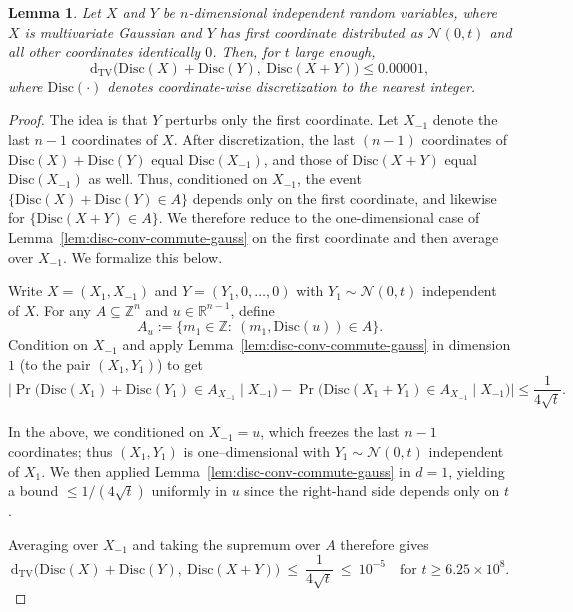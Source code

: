\documentclass[10pt]{article} %
\theoremstyle{plain}
\newtheorem{lemma}[theorem]{Lemma}
\newcommand{\dtv}{\mathrm{d_{TV}}}
\newcommand{\disc}{\mathrm{Disc}}
\begin{document}
\begin{lemma}
\label{lem:lem:conv-disc-close-to-disc-conv_multi_var}
Let $X$ and $Y$ be $n$-dimensional independent random variables, where $X$ is multivariate Gaussian and $Y$ has first coordinate distributed as $\mathcal{N}(0,t)$ and all other coordinates identically $0$. Then, for $t$ large enough,
\[
\dtv\!\big(\disc(X)+\disc(Y),\ \disc(X+Y)\big) \le 0.00001,
\]
where $\disc(\cdot)$ denotes coordinate-wise discretization to the nearest integer.
\end{lemma}
\begin{proof}
The idea is that $Y$ perturbs only the first coordinate. Let $X_{-1}$ denote the last $n\!-\!1$ coordinates of $X$. After discretization, the last $(n\!-\!1)$ coordinates of $\disc(X)+\disc(Y)$ equal $\disc(X_{-1})$, and those of $\disc(X+Y)$ equal $\disc(X_{-1})$ as well. Thus, conditioned on $X_{-1}$, the event $\{\disc(X)+\disc(Y)\in A\}$ depends only on the first coordinate, and likewise for $\{\disc(X+Y)\in A\}$. We therefore reduce to the one-dimensional case of Lemma~\ref{lem:disc-conv-commute-gauss} on the first coordinate and then average over $X_{-1}$. We formalize this below.

Write $X=(X_1,X_{-1})$ and $Y=(Y_1,0,\ldots,0)$ with $Y_1\sim\mathcal{N}(0,t)$ independent of $X$. For any $A\subseteq\mathbb{Z}^n$ and $u\in\mathbb{R}^{n-1}$, define
\[
A_u:=\{m_1\in\mathbb{Z}:\ (m_1,\disc(u))\in A\}.
\]
Condition on $X_{-1}$ and apply Lemma~\ref{lem:disc-conv-commute-gauss} in dimension $1$ (to the pair $(X_1,Y_1)$) to get
\[
\Big|\Pr\!\big(\disc(X_1)+\disc(Y_1)\in A_{X_{-1}}\mid X_{-1}\big)
-\Pr\!\big(\disc(X_1+Y_1)\in A_{X_{-1}}\mid X_{-1}\big)\Big|
\le \frac{1}{4\sqrt{t}}.
\]

In the above, we conditioned on $X_{-1}=u$, which freezes the last $n\!-\!1$ coordinates; thus $(X_1,Y_1)$ is one–dimensional with $Y_1\sim\mathcal{N}(0,t)$ independent of $X_1$. We then applied Lemma~\ref{lem:disc-conv-commute-gauss} in $d=1$, yielding a bound $\le 1/(4\sqrt{t})$ uniformly in $u$ since the right-hand side depends only on $t$. 

Averaging over $X_{-1}$ and taking the supremum over $A$ therefore gives
\[
\dtv\!\big(\disc(X)+\disc(Y),\ \disc(X+Y)\big)\ \le\ \frac{1}{4\sqrt{t}}\ \le\ 10^{-5}
\quad\text{for } t\ge 6.25\times 10^{8}.
\]
\end{proof}







	
	
\end{document}
